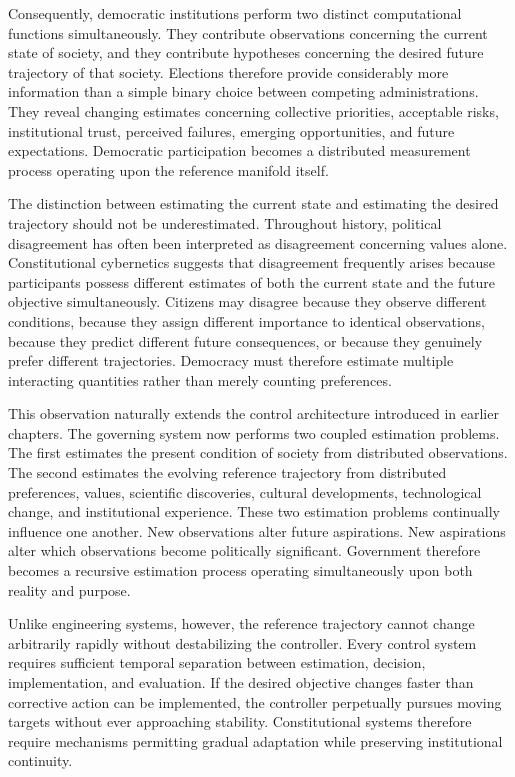 \documentclass[12pt,a4paper]{article}
\begin{document}
Consequently, democratic institutions perform two distinct computational functions simultaneously. They contribute observations concerning the current state of society, and they contribute hypotheses concerning the desired future trajectory of that society. Elections therefore provide considerably more information than a simple binary choice between competing administrations. They reveal changing estimates concerning collective priorities, acceptable risks, institutional trust, perceived failures, emerging opportunities, and future expectations. Democratic participation becomes a distributed measurement process operating upon the reference manifold itself.

The distinction between estimating the current state and estimating the desired trajectory should not be underestimated. Throughout history, political disagreement has often been interpreted as disagreement concerning values alone. Constitutional cybernetics suggests that disagreement frequently arises because participants possess different estimates of both the current state and the future objective simultaneously. Citizens may disagree because they observe different conditions, because they assign different importance to identical observations, because they predict different future consequences, or because they genuinely prefer different trajectories. Democracy must therefore estimate multiple interacting quantities rather than merely counting preferences.

This observation naturally extends the control architecture introduced in earlier chapters. The governing system now performs two coupled estimation problems. The first estimates the present condition of society from distributed observations. The second estimates the evolving reference trajectory from distributed preferences, values, scientific discoveries, cultural developments, technological change, and institutional experience. These two estimation problems continually influence one another. New observations alter future aspirations. New aspirations alter which observations become politically significant. Government therefore becomes a recursive estimation process operating simultaneously upon both reality and purpose.

Unlike engineering systems, however, the reference trajectory cannot change arbitrarily rapidly without destabilizing the controller. Every control system requires sufficient temporal separation between estimation, decision, implementation, and evaluation. If the desired objective changes faster than corrective action can be implemented, the controller perpetually pursues moving targets without ever approaching stability. Constitutional systems therefore require mechanisms permitting gradual adaptation while preserving institutional continuity.
\end{document}
